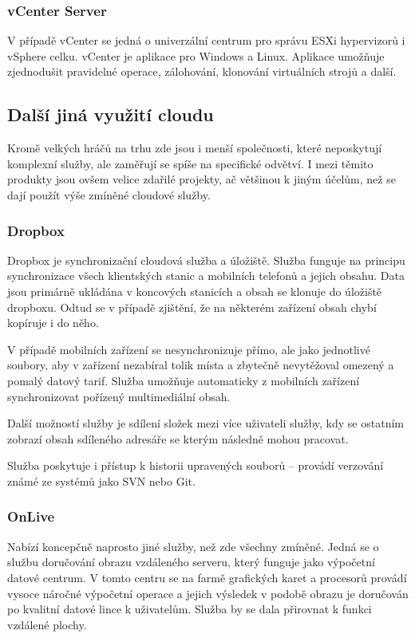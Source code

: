 \subsubsection{vCenter Server}
V případě vCenter se jedná o univerzální centrum pro správu ESXi hypervizorů i vSphere celku. vCenter je aplikace pro Windows a Linux. Aplikace umožňuje zjednodušit pravidelné operace, zálohování, klonování virtuálních strojů a další. 

\subsection{Další jiná využití cloudu}
Kromě velkých hráčů na trhu zde jsou i menší společnosti, které neposkytují komplexní služby, ale zaměřují se spíše na specifické odvětví. I mezi těmito produkty jsou ovšem velice zdařilé projekty, ač většinou k jiným účelům, než se dají použít výše zmíněné cloudové služby.

\subsubsection{Dropbox}
Dropbox je synchronizační cloudová služba a úložiště. Služba funguje na principu synchronizace všech klientských stanic a mobilních telefonů a jejich obsahu. Data jsou primárně ukládána v koncových stanicích a obsah se klonuje do úložiště dropboxu. Odtud se v případě zjištění, že na některém zařízení obsah chybí kopíruje i do něho. 

V případě mobilních zařízení se nesynchronizuje přímo, ale jako jednotlivé soubory, aby v zařízení nezabíral tolik místa a zbytečně nevytěžoval omezený a pomalý datový tarif. Služba umožňuje automaticky z mobilních zařízení synchronizovat pořízený multimediální obsah.

Další možností služby je sdílení složek mezi více uživateli služby, kdy se ostatním zobrazí obsah sdíleného adresáře se kterým následně mohou pracovat.

Služba poskytuje i přístup k historii upravených souborů -- provádí verzování známé ze systémů jako SVN nebo Git.

\subsubsection{OnLive}
\label{sec:onlive}
Nabízí koncepčně naprosto jiné služby, než zde všechny zmíněné. Jedná se o službu doručování obrazu vzdáleného serveru, který funguje jako výpočetní datové centrum. V tomto centru se na farmě grafických karet a procesorů provádí vysoce náročné výpočetní operace a jejich výsledek v podobě obrazu je doručován po kvalitní datové lince k uživatelům. Služba by se dala přirovnat k funkci vzdálené plochy.


